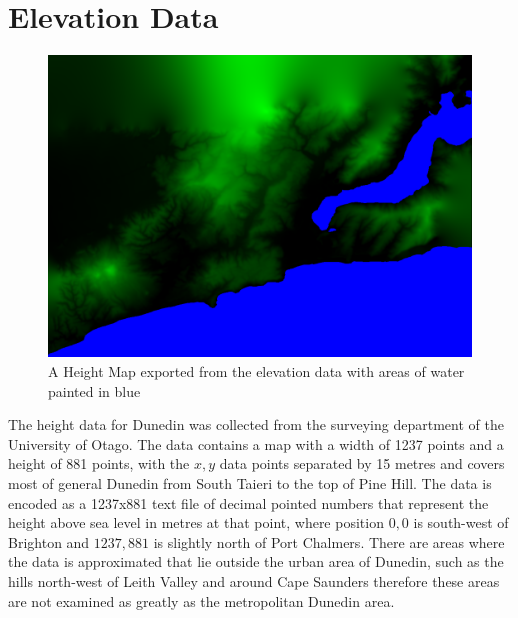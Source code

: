 \documentclass[12pt]{report}
\begin{document}
\section{Elevation Data}

\begin{figure}[h]
\includegraphics[scale=0.25]{heightmapandwater.png}
\caption{A Height Map exported from the elevation data with areas of water painted in blue}
\label{image:elevation-water}
\end{figure}
The height data for Dunedin was collected from the surveying department of the University of Otago. The data contains a map with a width of 1237 points and a height of 881 points, with the $x,y$ data points separated by 15 metres and covers most of general Dunedin from South Taieri to the top of Pine Hill. The data is encoded as a 1237x881 text file of decimal pointed numbers that represent the height above sea level in metres at that point, where position $0,0$ is south-west of Brighton and $1237,881$ is slightly north of Port Chalmers. There are areas where the data is approximated that lie outside the urban area of Dunedin, such as the hills north-west of Leith Valley and around Cape Saunders therefore these areas are not examined as greatly as the metropolitan Dunedin area.
\end{document}
